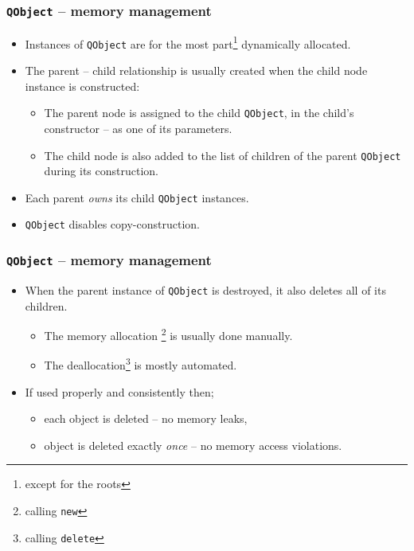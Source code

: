 \begin{frame}
  \frametitle{\texttt{QObject} -- memory management}
  \begin{itemize}
    \item Instances of \texttt{QObject} are for the most part\footnote{except
      for the roots} dynamically allocated.
    \item The parent -- child relationship is usually created when the child
    node instance is constructed:
    \begin{itemize}
      \item The parent node is assigned to the child \texttt{QObject},
        in the child's constructor -- as one of its parameters.
      \item The child node is also added to the list of children of the parent
        \texttt{QObject} during its construction.
    \end{itemize}
    \item Each parent {\em owns} its child \texttt{QObject} instances.
    \item \texttt{QObject} disables copy-construction.
  \end{itemize}
\end{frame}

\begin{frame}
  \frametitle{\texttt{QObject} -- memory management}
  \begin{itemize}
    \item When the parent instance of \texttt{QObject} is destroyed, it also
      deletes all of its children.
    \begin{itemize}
      \item The memory allocation \footnote{calling \texttt{new}} is
        usually done manually.
      \item The deallocation\footnote{calling \texttt{delete}} is mostly automated.
    \end{itemize}
    \item If used properly and consistently then;
    \begin{itemize}
      \item each object is deleted -- no memory leaks,
      \item object is deleted exactly {\em once} -- no memory access violations.
    \end{itemize}
  \end{itemize}
\end{frame}

